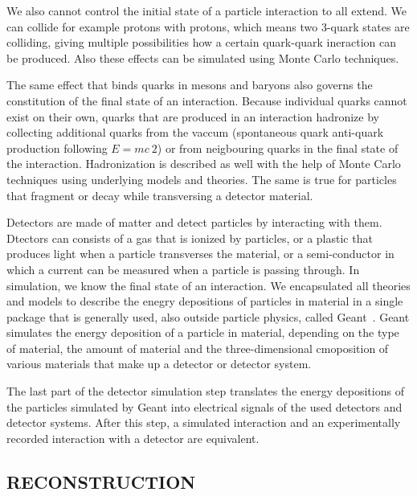 \documentclass{wscpaperproc}
\theoremstyle{wsc}
\begin{document}
We also cannot control the initial state of a particle interaction to all extend. We can collide for example protons with protons, which means two 3-quark states are colliding, giving multiple possibilities how a certain quark-quark ineraction can be produced. Also these effects can be simulated using Monte Carlo techniques.

The same effect that binds quarks in mesons and baryons also governs the constitution of the final state of an interaction. Because individual quarks cannot exist on their own, quarks that are produced in an interaction hadronize by collecting additional quarks from the vaccum (spontaneous quark anti-quark production following $E=mc~2$) or from neigbouring quarks in the final state of the interaction. Hadronization is described as well with the help of Monte Carlo techniques using underlying models and theories. The same is true for particles that fragment or decay while transversing a detector material.

Detectors are made of matter and detect particles by interacting with them. Dtectors can consists of a gas that is ionized by particles, or a plastic that produces light when a particle transverses the material, or a semi-conductor in which a current can be measured when a particle is passing through. In simulation, we know the final state of an interaction. We encapsulated all theories and models to describe the enegry depositions of particles in material in a single package that is generally used, also outside particle physics, called Geant~. Geant simulates the energy deposition of a particle in material, depending on the type of material, the amount of material and the three-dimensional cmoposition of various materials that make up a detector or detector system. 

The last part of the detector simulation step translates the energy depositions of the particles simulated by Geant into electrical signals of the used detectors and detector systems. After this step, a simulated interaction and an experimentally recorded interaction with a detector are equivalent.

\subsection{RECONSTRUCTION}
\label{subsec:reconstruction}
\end{document}
